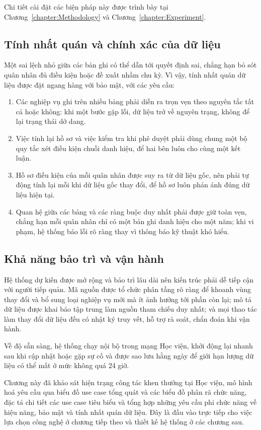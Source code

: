 \documentclass[../DoAn.tex]{subfiles}
\begin{document}
Chi tiết cài đặt các biện pháp này được trình bày tại Chương~\ref{chapter:Methodology} và Chương~\ref{chapter:Experiment}.

\subsection{Tính nhất quán và chính xác của dữ liệu}
\label{subsection:2.4.3}

Một sai lệch nhỏ giữa các bản ghi có thể dẫn tới quyết định sai, chẳng hạn bỏ sót quân nhân đủ điều kiện hoặc đề xuất nhầm chu kỳ.
Vì vậy, tính nhất quán dữ liệu được đặt ngang hàng với bảo mật, với các yêu cầu:

\begin{enumerate}
    \item Các nghiệp vụ ghi trên nhiều bảng phải diễn ra trọn vẹn theo nguyên tắc tất cả hoặc không: khi một bước gặp lỗi, dữ liệu trở về nguyên trạng, không để lại trạng thái dở dang.
    \item Việc tính lại hồ sơ và việc kiểm tra khi phê duyệt phải dùng chung một bộ quy tắc xét điều kiện chuỗi danh hiệu, để hai bên luôn cho cùng một kết luận.
    \item Hồ sơ điều kiện của mỗi quân nhân được suy ra từ dữ liệu gốc, nên phải tự động tính lại mỗi khi dữ liệu gốc thay đổi, để hồ sơ luôn phản ánh đúng dữ liệu hiện tại.
    \item Quan hệ giữa các bảng và các ràng buộc duy nhất phải được giữ toàn vẹn, chẳng hạn mỗi quân nhân chỉ có một bản ghi danh hiệu cho một năm; khi vi phạm, hệ thống báo lỗi rõ ràng thay vì thông báo kỹ thuật khó hiểu.
\end{enumerate}

\subsection{Khả năng bảo trì và vận hành}
\label{subsection:2.4.4}

Hệ thống dự kiến được mở rộng và bảo trì lâu dài nên kiến trúc phải dễ tiếp cận với người tiếp quản.
Mã nguồn được tổ chức phân tầng rõ ràng để khoanh vùng thay đổi và bổ sung loại nghiệp vụ mới mà ít ảnh hưởng tới phần còn lại; mô tả dữ liệu được khai báo tập trung làm nguồn tham chiếu duy nhất; và mọi thao tác làm thay đổi dữ liệu đều có nhật ký truy vết, hỗ trợ rà soát, chẩn đoán khi vận hành.

Về độ sẵn sàng, hệ thống chạy nội bộ trong mạng Học viện, khởi động lại nhanh sau khi cập nhật hoặc gặp sự cố và được sao lưu hằng ngày để giới hạn lượng dữ liệu có thể mất ở mức không quá 24 giờ.

Chương này đã khảo sát hiện trạng công tác khen thưởng tại Học viện, mô hình hoá yêu cầu qua biểu đồ use case tổng quát và các biểu đồ phân rã chức năng, đặc tả chi tiết các use case tiêu biểu và tổng hợp những yêu cầu phi chức năng về hiệu năng, bảo mật và tính nhất quán dữ liệu.
Đây là đầu vào trực tiếp cho việc lựa chọn công nghệ ở chương tiếp theo và thiết kế hệ thống ở các chương sau.
\end{document}
